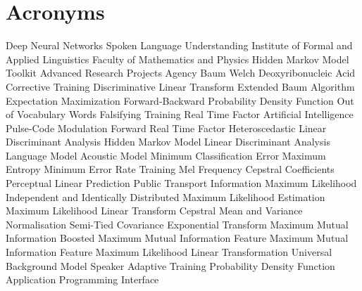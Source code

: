 \chapter{Acronyms}
\label{cha:acronyms}

\begin{acronym}[TDMA]
     {Deep Neural Networks}
     {Spoken Language Understanding}
     {Institute of Formal and Applied Linguistics}
     {Faculty of Mathematics and Physics}
     {Hidden Markov Model Toolkit}
     {Advanced Research Projects Agency}
     {Baum Welch}
     {Deoxyribonucleic Acid}
     {Corrective Training}
     {Discriminative Linear Transform}
     {Extended Baum Algorithm}
     {Expectation Maximization}
     {Forward-Backward}
     {Probability Density Function}
     {Out of Vocabulary Words}
     {Falsifying Training}
     {Real Time Factor}
     {Artificial Intelligence}
     {Pulse-Code Modulation}
     {Forward Real Time Factor}
     {Heteroscedastic Linear Discriminant Analysis}
     {Hidden Markov Model}
     {Linear Discriminant Analysis}
     {Language Model}
     {Acoustic Model}
     {Minimum Classification Error}
     {Maximum Entropy}
     {Minimum Error Rate Training}
     {Mel Frequency Cepstral Coefficients}
     {Perceptual Linear Prediction}
     {Public Transport Information}
     {Maximum Likelihood}
     {Independent and Identically Distributed}
     {Maximum Likelihood Estimation}
     {Maximum Likelihood Linear Transform}
     {Cepstral Mean and Variance Normalisation}
     {Semi-Tied Covariance}
     {Exponential Transform}
     {Maximum Mutual Information}
     {Boosted Maximum Mutual Information}
     {Feature Maximum Mutual Information}
     {Feature Maximum Likelihood Linear Transformation}
     {Universal Background Model}
     {Speaker Adaptive Training}
     {Probability Density Function}
     {Application Programming Interface}


\end{acronym}
